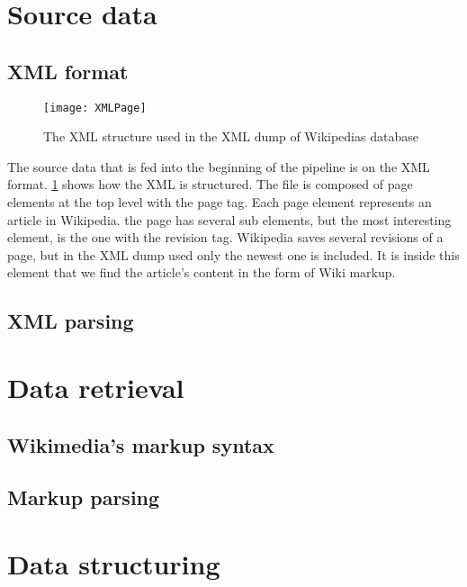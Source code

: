\section{Source data}


\subsection{XML format}
\begin{figure}[h]
\caption{The XML structure used in the XML dump of Wikipedias database}
\texttt{[image: XMLPage]}
\label{fig:xml}
\end{figure}

The source data that is fed into the beginning of the pipeline is on the XML format. \ref{fig:xml} shows how the XML is structured. The file is composed of page elements at the top level with the page tag. Each page element represents an article in Wikipedia. the page has several sub elements, but the most interesting element, is the one with the revision tag. Wikipedia saves several revisions of a page, but in the XML dump used only the newest one is included. It is inside this element that we find the article's content in the form of Wiki markup.


\subsection{XML parsing}


\section{Data retrieval}

\subsection{Wikimedia's markup syntax}


\subsection{Markup parsing}


\section{Data structuring}

